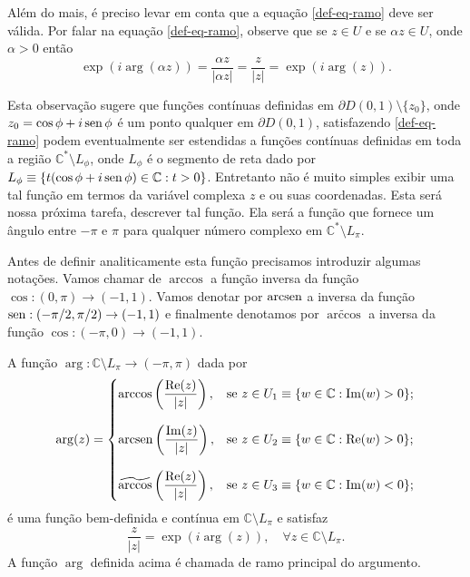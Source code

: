 Além do mais, é preciso levar em conta que 
a equação \eqref{def-eq-ramo} deve ser válida. 
Por falar na equação \eqref{def-eq-ramo}, observe que se $z\in U$ 
e se $\alpha z\in U$, onde $\alpha>0$ então
\[
\exp(i\arg(\alpha z))= \frac{\alpha z}{|\alpha z|} = \frac{z}{|z|} = \exp(i\arg(z)).
\]

Esta observação sugere que funções contínuas definidas em 
$\partial D(0,1)\setminus\{z_0\}$, onde $z_0=\cos\phi+i\operatorname{sen}\phi$ 
é um ponto qualquer em $\partial D(0,1)$,
satisfazendo \eqref{def-eq-ramo} podem eventualmente ser estendidas a funções contínuas
definidas em toda a região $\mathbb{C}^{*}\setminus L_{\phi}$, onde  
$L_{\phi}$ é o segmento de reta dado por 
$L_{\phi}\equiv \{t(\cos\phi+i\operatorname{sen} \phi)\in \mathbb{C}: t>0\}$.
Entretanto não é muito simples exibir uma tal função em termos da variável 
complexa $z$ e ou suas coordenadas. Esta será nossa próxima tarefa, descrever tal função.
Ela será a função que fornece um ângulo entre $-\pi$ e $\pi$ para qualquer 
número complexo em $\mathbb{C}^{*}\setminus L_{\pi}$. 

Antes de definir analiticamente esta função precisamos 
introduzir algumas notações. Vamos chamar de $\arccos$
a função inversa da função $\cos:(0,\pi)\to(-1,1)$. Vamos denotar por 
$\operatorname{arcsen}$ a inversa da função $\operatorname{sen}:(-\pi/2,\pi/2)\to(-1,1)$ e finalmente
denotamos por $\widetilde{\arccos}$ a inversa da função $\cos:(-\pi,0)\to (-1,1)$.

\begin{teorema}\label{teo-def-ramo-principal-argumento}
A função $\arg:\mathbb{C}\setminus L_{\pi}\to (-\pi,\pi)$ dada por 
\[
\arg(z)
=
\begin{cases}
\arccos\left( \displaystyle\frac{\mathrm{Re}(z)}{|z|} \right),
&\text{se}\ z\in U_1\equiv \{w\in\mathbb{C}: \mathrm{Im}(w)>0\};
\\[0.6cm]
\operatorname{arcsen}\left( \displaystyle\frac{\mathrm{Im}(z)}{|z|} \right),
&\text{se}\ z\in U_2\equiv \{w\in\mathbb{C}: \mathrm{Re}(w)>0\};
\\[0.6cm]
\widetilde{\arccos}\left( \displaystyle\frac{\mathrm{Re}(z)}{|z|} \right),
&\text{se}\ z\in U_3\equiv \{w\in\mathbb{C}: \mathrm{Im}(w)<0\};
\end{cases}
\]
é uma função bem-definida e contínua em $\mathbb{C}\setminus L_{\pi}$ e satisfaz
\[
\frac{z}{|z|} = \exp(i\arg(z)),\quad \forall z\in \mathbb{C}\setminus L_{\pi}.
\]
A função $\arg$ definida acima é chamada de ramo principal do argumento.
\end{teorema}


